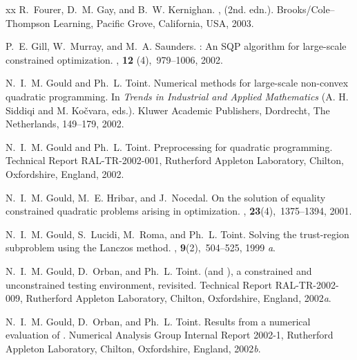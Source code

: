 \documentclass[acmtocl,acmnow]{acmtrans2m}
\begin{document}
\begin{thebibliography}{xx}
R.~Fourer, D.~M. Gay, and B.~W. Kernighan.
,
(2nd. edn.).
\newblock Brooks/Cole--Thompson Learning, Pacific Grove, California, USA, 2003.

P.~E. Gill, W.~Murray, and M.~A. Saunders.
: An {SQP} algorithm for large-scale constrained optimization.
, {\bf 12} (4),~979--1006, 2002.

N.~I.~M. Gould and Ph.~L. Toint.
\newblock Numerical methods for large-scale non-convex quadratic programming.
\newblock In {\em Trends in Industrial and Applied Mathematics}
(A. H. Siddiqi and M. Ko\v{c}vara, eds.).
\newblock Kluwer Academic Publishers, Dordrecht, The Netherlands, 149--179, 
2002.

N.~I.~M. Gould and Ph.~L. Toint.
\newblock Preprocessing for quadratic programming.
\newblock Technical Report RAL-TR-2002-001, Rutherford Appleton Laboratory,
  Chilton, Oxfordshire, England, 2002.

N.~I.~M. Gould, M.~E. Hribar, and J.~Nocedal.
\newblock On the solution of equality constrained quadratic problems arising in
  optimization.
, {\bf 23}(4),~1375--1394,
  2001.

N.~I.~M. Gould, S.~Lucidi, M.~Roma, and Ph.~L. Toint.
\newblock Solving the trust-region subproblem using the {L}anczos method.
, {\bf 9}(2),~504--525, 1999{\em
  a}.

N.~I.~M. Gould, D.~Orban, and Ph.~L. Toint.
 (and \rm), a constrained and unconstrained
  testing environment, revisited.
\newblock Technical Report RAL-TR-2002-009, Rutherford Appleton Laboratory,
  Chilton, Oxfordshire, England, 2002{\em a}.

N.~I.~M. Gould, D.~Orban, and Ph.~L. Toint.
\newblock Results from a numerical evaluation of  \rm.
\newblock Numerical Analysis Group Internal Report 2002-1, Rutherford Appleton
  Laboratory, Chilton, Oxfordshire, England, 2002{\em b}.


\end{thebibliography}
\end{document}
